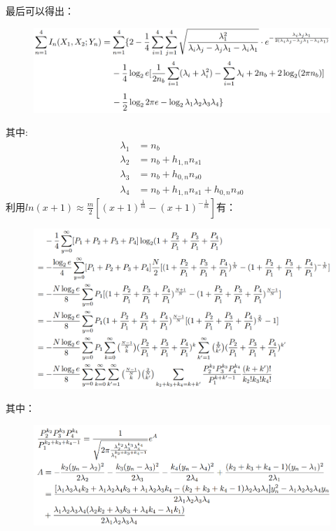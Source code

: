 \documentclass[12pt]{article}
\begin{document}
\newpage
最后可以得出：\par
\begin{figure}[htpb]
    \flushleft 
    \includegraphics[width=17.1cm]{8.png}
\end{figure}
其中:
\begin{equation*}
    \begin{aligned}
       \lambda_1&=n_b \\
       \lambda_2&=n_b+h_{1,n}n_{s1} \\
       \lambda_3&=n_b+h_{0,n}n_{s0} \\
       \lambda_4&=n_b+h_{1,n}n_{s1}+h_{0,n}n_{s0} 
    \end{aligned}
\end{equation*}
利用$ln(x+1)\approx\frac{m}{2}\left[(x+1)^{\frac{1}{m}}-(x+1)^{-\frac{1}{m}}\right]$有：
\begin{figure}[htpb]
    \flushleft 
    \includegraphics[width=17.1cm]{9.png}
\end{figure}
\newpage
其中：\par
\begin{figure}[htpb]
    \flushleft 
    \includegraphics[width=17.4cm]{10.png}
\end{figure}
\end{document}
